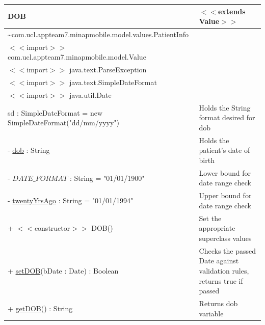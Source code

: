 \documentclass[12pt,a4paper,oneside,titlepage]{article}
\begin{document}
\begin{center}
	\begin{tabular}{| p{13cm} | p{5cm} |}
	\hline
	\textbf{DOB} & \textbf{$<<$extends Value$>>$} \\ \hline
	\textasciitilde com.ucl.appteam7.minapmobile.model.values.PatientInfo & \\ \hline
	$<<$import$>>$ com.ucl.appteam7.minapmobile.model.Value & \\ \hline
	$<<$import$>>$ java.text.ParseException & \\ \hline
	$<<$import$>>$ java.text.SimpleDateFormat & \\ \hline
	$<<$import$>>$ java.util.Date & \\ \hline \hline
	sd : SimpleDateFormat = new SimpleDateFormat("dd/mm/yyyy") & Holds the String format desired for dob \\ \hline
	- \underline{dob} : String & Holds the patient's date of birth \\ \hline
	- \underline{$DATE\_FORMAT$} : String = "01/01/1900" & Lower bound for date range check \\ \hline
	- \underline{twentyYrsAgo} : String = "01/01/1994" & Upper bound for date range check \\ \hline \hline
	+ $<<$constructor$>>$ DOB() & Set the appropriate superclass values \\ \hline
	+ \underline{setDOB}(bDate : Date) : Boolean & Checks the passed Date against validation rules, returns true if passed \\ \hline
	+ \underline{getDOB}() : String & Returns dob variable \\ \hline
	\end{tabular}
\end{center}
\end{document}
